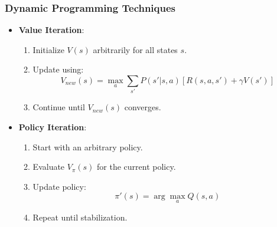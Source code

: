 \documentclass[aspectratio=169]{beamer}
\begin{document}
\begin{frame}[fragile]
    \frametitle{Dynamic Programming Techniques}
    \begin{itemize}
        \item \textbf{Value Iteration}:
        \begin{enumerate}
            \item Initialize \( V(s) \) arbitrarily for all states \( s \).
            \item Update using:
            \begin{equation}
            V_{new}(s) = \max_a \sum_{s'} P(s' | s, a) \left[R(s, a, s') + \gamma V(s')\right]
            \end{equation}
            \item Continue until \( V_{new}(s) \) converges.
        \end{enumerate}
        
        \item \textbf{Policy Iteration}:
        \begin{enumerate}
            \item Start with an arbitrary policy.
            \item Evaluate \( V_\pi(s) \) for the current policy.
            \item Update policy: 
            \begin{equation}
            \pi'(s) = \arg\max_a Q(s, a)
            \end{equation}
            \item Repeat until stabilization.
        \end{enumerate}
    \end{itemize}
\end{frame}
\end{document}

